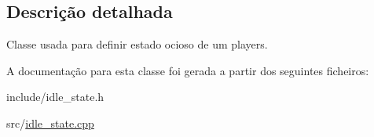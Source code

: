 \subsection{Descrição detalhada}
Classe usada para definir estado ocioso de um players. 

A documentação para esta classe foi gerada a partir dos seguintes ficheiros\+:\begin{DoxyCompactItemize}
\item 
include/idle\+\_\+state.\+h\item 
src/\mbox{\hyperlink{idle__state_8cpp}{idle\+\_\+state.\+cpp}}\end{DoxyCompactItemize}
